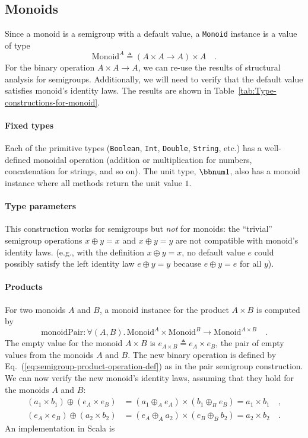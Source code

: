 \subsection{Monoids\label{subsec:Monoids-constructions}}

Since a monoid is a semigroup with a default value, a \lstinline!Monoid!
instance is a value of type
\[
\text{Monoid}^{A}\triangleq\left(A\times A\rightarrow A\right)\times A\quad.
\]
For the binary operation $A\times A\rightarrow A$, we can re-use
the results of structural analysis for semigroups. Additionally, we
will need to verify that the default value satisfies monoid\textsf{'}s identity
laws. The results are shown in Table~\ref{tab:Type-constructions-for-monoid}.

\paragraph{Fixed types}

Each of the primitive types (\lstinline!Boolean!, \lstinline!Int!,
\lstinline!Double!, \lstinline!String!, etc.) has a well-defined
monoidal operation (addition or multiplication for numbers, concatenation
for strings, and so on). The unit type, $\bbnum 1$, also has a monoid
instance where all methods return the unit value $1$.

\paragraph{Type parameters}

This construction works for semigroups but \emph{not} for monoids:
the \textsf{``}trivial\textsf{''} semigroup operations $x\oplus y=x$ and $x\oplus y=y$
are not compatible with monoid\textsf{'}s identity laws. (e.g., with the definition
$x\oplus y=x$, no default value $e$ could possibly satisfy the left
identity law $e\oplus y=y$ because $e\oplus y=e$ for all $y$).

\paragraph{Products}

For two monoids $A$ and $B$, a monoid instance for the product $A\times B$
is computed by
\[
\text{monoidPair}:\forall(A,B).\,\text{Monoid}^{A}\times\text{Monoid}^{B}\rightarrow\text{Monoid}^{A\times B}\quad.
\]
The empty value for the monoid $A\times B$ is $e_{A\times B}\triangleq e_{A}\times e_{B}$,
the pair of empty values from the monoids $A$ and $B$. The new binary
operation is defined by Eq.~(\ref{eq:semigroup-product-operation-def})
as in the pair semigroup construction. We can now verify the new monoid\textsf{'}s
identity laws, assuming that they hold for the monoids $A$ and $B$:
\begin{align*}
(a_{1}\times b_{1})\oplus(e_{A}\times e_{B}) & =(a_{1}\oplus_{A}e_{A})\times(b_{1}\oplus_{B}e_{B})=a_{1}\times b_{1}\quad,\\
(e_{A}\times e_{B})\oplus(a_{2}\times b_{2}) & =(e_{A}\oplus_{A}a_{2})\times(e_{B}\oplus_{B}b_{2})=a_{2}\times b_{2}\quad.
\end{align*}
An implementation in Scala is

